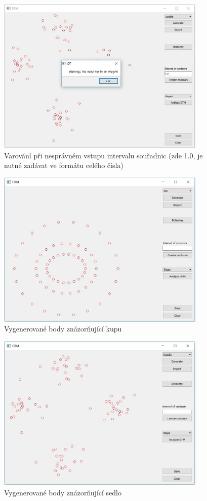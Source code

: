 \documentclass[a4paper, 12pt]{article}
\begin{document}
\begin{figure}[h!]
\centering
\includegraphics[width=10cm]{pictures/warning.jpg}
\caption{Varování při nesprávném vstupu intervalu souřadnic (zde 1.0, je nutné zadávat ve formátu celého čísla)}
\end{figure}

\begin{figure}[h!]
\centering
\includegraphics[width=10cm]{pictures/hill.jpg}
\caption{Vygenerované body znázorňující kupu}
\end{figure}

\begin{figure}[h!]
\centering
\includegraphics[width=10cm]{pictures/saddle.jpg}
\caption{Vygenerované body znázorňující sedlo}
\end{figure}
\end{document}
